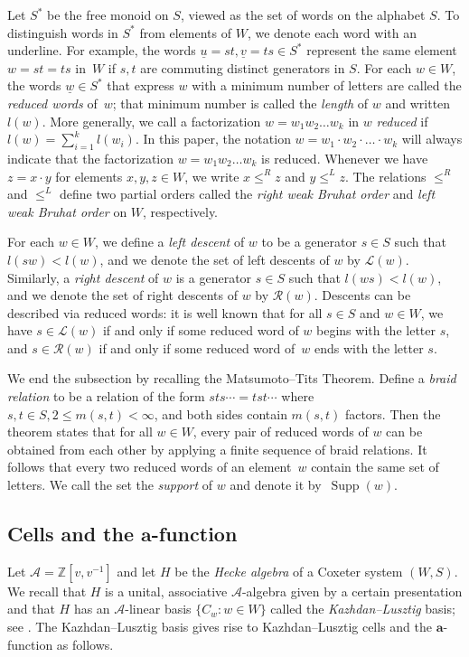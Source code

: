 \documentclass[ALCO,Unicode,published]{cedram}
\newcommand{\Z}{\mathbb{Z}}
\newcommand{\cala}{\mathcal{A}}
\newcommand{\call}{\mathcal{L}}
\newcommand{\calr}{\mathcal{R}}
\newcommand{\la}{\mathbf{a}}
\newcommand{\ul}{\underline}
\newcommand{\inverse}{^{-1}}
\DeclareMathOperator{\supp}{\mathrm{Supp}}
\begin{document}
Let $S^*$ be the free monoid on $S$, viewed as the set of words on the alphabet $S$. To distinguish
words in $S^*$ from elements of $W$, we denote each word with an underline.  For example, the words
$\ul u=st, \ul v=ts\in S^*$ represent the same element $w=st=ts$ in~$W$ if $s,t$ are commuting
distinct generators in $S$.  For each $w\in W$, the words $\ul w\in S^*$ that express $w$ with a
minimum number of letters are called the \emph{reduced words} of~$w$; that minimum number is called
the \emph{length} of $w$ and written $l(w)$. More generally, we call a factorization $w=w_1w_2\dots
w_k$ in $w$ \emph{reduced} if $l(w)=\sum_{i=1}^k l(w_i)$. In this paper, the notation $w=w_1\cdot
w_2\cdot \dots \cdot w_k$ will always indicate that the factorization $w=w_1w_2\dots w_k$ is
reduced.  Whenever we have $z=x\cdot y$ for elements $x,y,z\in W$, we write $x\le^R z$ and $y\le^L
z$. The relations $\le^R$ and $\le^L$ define two partial orders called the \emph{right weak Bruhat
order} and \emph{left weak Bruhat order} on $W$, respectively.

For each $w\in W$, we define a \emph{left descent} of $w$ to be a generator $s\in S$ such that
$l(sw)<l(w)$, and we denote the set of left descents of $w$ by $\call(w)$. Similarly, a \emph{right
descent} of $w$ is a generator $s\in S$ such that $l(ws)<l(w)$, and we denote the set of right
descents of $w$ by $\calr(w)$. Descents can be described via reduced words: it is well known that
for all $s\in S$ and $w\in W$, we have $s\in \call(w)$ if and only if some reduced word of $w$
begins with the letter $s$, and $s\in \calr(w)$ if and only if some reduced word of~$w$ ends with
the letter $s$.  

We end the subsection by recalling the Matsumoto--Tits Theorem. Define a \emph{braid relation} to be
a relation of the form $sts\cdots=tst\cdots$ where $s,t\in S, 2\le m(s,t)<\infty$, and both sides
contain $m(s,t)$ factors. Then the theorem states that for all $w\in W$, every pair of reduced words
of $w$ can be obtained from each other by applying a finite sequence of braid relations. It follows
that every two reduced words of an element~$w$ contain the same set of letters. We call the set the
\emph{support} of $w$ and denote it by~$\supp(w)$.

\subsection{Cells and the \texorpdfstring{$\la$}{a}-function}
\label{sec:HeckeAlgebras}
Let $\cala=\Z[v,v\inverse]$ and let $H$ be the \emph{Hecke algebra} of a Coxeter system $(W,S)$.  We
recall that $H$ is a unital, associative $\cala$-algebra given by a certain presentation and that
$H$ has an $\cala$-linear basis $\{C_w:w\in W\}$ called the \emph{Kazhdan--Lusztig} basis; see
\cite[\S 2.2]{XuSubregular}. The Kazhdan--Lusztig basis gives rise to Kazhdan--Lusztig cells and the
$\la$-function as follows.
\end{document}
